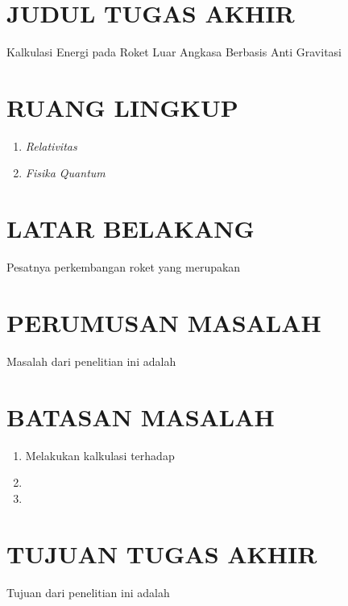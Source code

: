 \section{JUDUL TUGAS AKHIR}

Kalkulasi Energi pada Roket Luar Angkasa Berbasis Anti Gravitasi
\vspace{0.5ex}

\section{RUANG LINGKUP}

\begin{enumerate}[nolistsep]
  \item \textit{Relativitas}
  \item \textit{Fisika Quantum}
\end{enumerate}

\section{LATAR BELAKANG}

Pesatnya perkembangan roket yang merupakan \lipsum[1]

\lipsum[2]

\lipsum[3][1-10]

\section{PERUMUSAN MASALAH}

Masalah dari penelitian ini adalah \lipsum[1][1-6]

\section{BATASAN MASALAH}

\begin{enumerate}[nolistsep]
  \item Melakukan kalkulasi terhadap \lipsum[1][1]
  \item \lipsum[1][2]
  \item \lipsum[1][3]
\end{enumerate}

\section{TUJUAN TUGAS AKHIR}

Tujuan dari penelitian ini adalah \lipsum[1][1-6]